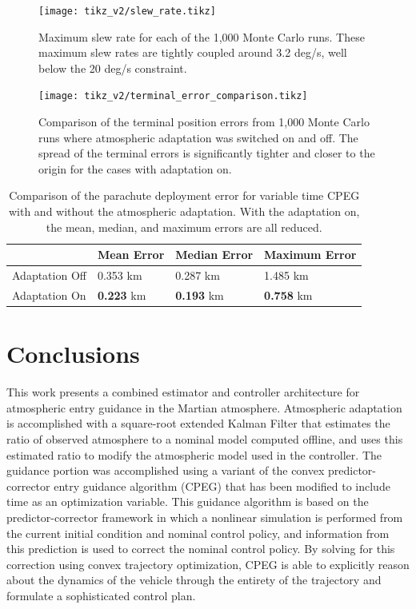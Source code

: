\begin{figure}
    \centering
    \texttt{[image: tikz\_v2/slew\_rate.tikz]}
    \caption{Maximum slew rate for each of the 1,000 Monte Carlo runs. These maximum slew rates are tightly coupled around 3.2 deg/s, well below the 20 deg/s constraint.}
    \label{fig:slew_rate}
\end{figure}
\begin{figure}
    \centering
    \texttt{[image: tikz\_v2/terminal\_error\_comparison.tikz]}
    \caption{Comparison of the terminal position errors from 1,000 Monte Carlo runs where atmospheric adaptation was switched on and off. The spread of the terminal errors is significantly tighter and closer to the origin for the cases with adaptation on.}
    \label{fig:terminal_errors}
\end{figure}
\begin{table}[H]
\centering
\caption{Comparison of the parachute deployment error for variable time CPEG with and without the atmospheric adaptation. With the adaptation on, the mean, median, and maximum errors are all reduced.}
\begin{tabular}{llll} \hline \hline 
           & Mean Error & Median Error & Maximum Error \\ \hline
Adaptation Off  &   0.353 km         &   0.287  km         &   1.485 km            \\
Adaptation On &  \textbf{0.223} km         & \textbf{0.193}   km          &  \textbf{0.758} km           \\ \hline \hline 
\end{tabular}
\label{term_err_tab}
\end{table}
\section{Conclusions}\label{sec:cpeg2:section7}

This work presents a combined estimator and controller architecture for atmospheric entry guidance in the Martian atmosphere. Atmospheric adaptation is accomplished with a square-root extended Kalman Filter that estimates the ratio of observed atmosphere to a nominal model computed offline, and uses this estimated ratio to modify the atmospheric model used in the controller. The guidance portion was accomplished using a variant of the convex predictor-corrector entry guidance algorithm (CPEG) that has been modified to include time as an optimization variable. This guidance algorithm is based on the predictor-corrector framework in which a nonlinear simulation is performed from the current initial condition and nominal control policy, and information from this prediction is used to correct the nominal control policy. By solving for this correction using convex trajectory optimization, CPEG is able to explicitly reason about the dynamics of the vehicle through the entirety of the trajectory and formulate a sophisticated control plan. 

